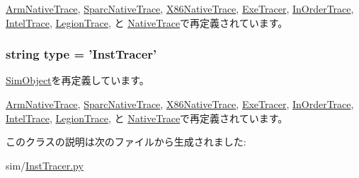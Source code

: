 \hyperlink{classArmNativeTrace_1_1ArmNativeTrace_a17da7064bc5c518791f0c891eff05fda}{ArmNativeTrace}, \hyperlink{classSparcNativeTrace_1_1SparcNativeTrace_a17da7064bc5c518791f0c891eff05fda}{SparcNativeTrace}, \hyperlink{classX86NativeTrace_1_1X86NativeTrace_a17da7064bc5c518791f0c891eff05fda}{X86NativeTrace}, \hyperlink{classExeTracer_1_1ExeTracer_a17da7064bc5c518791f0c891eff05fda}{ExeTracer}, \hyperlink{classInOrderTrace_1_1InOrderTrace_a17da7064bc5c518791f0c891eff05fda}{InOrderTrace}, \hyperlink{classIntelTrace_1_1IntelTrace_a17da7064bc5c518791f0c891eff05fda}{IntelTrace}, \hyperlink{classLegionTrace_1_1LegionTrace_a17da7064bc5c518791f0c891eff05fda}{LegionTrace}, と \hyperlink{classNativeTrace_1_1NativeTrace_a17da7064bc5c518791f0c891eff05fda}{NativeTrace}で再定義されています。\hypertarget{classInstTracer_1_1InstTracer_acce15679d830831b0bbe8ebc2a60b2ca}{
\subsubsection[{type}]{\setlength{\rightskip}{0pt plus 5cm}string {\bf type} = '{\bf InstTracer}'}}
\label{classInstTracer_1_1InstTracer_acce15679d830831b0bbe8ebc2a60b2ca}


\hyperlink{classm5_1_1SimObject_1_1SimObject_acce15679d830831b0bbe8ebc2a60b2ca}{SimObject}を再定義しています。

\hyperlink{classArmNativeTrace_1_1ArmNativeTrace_acce15679d830831b0bbe8ebc2a60b2ca}{ArmNativeTrace}, \hyperlink{classSparcNativeTrace_1_1SparcNativeTrace_acce15679d830831b0bbe8ebc2a60b2ca}{SparcNativeTrace}, \hyperlink{classX86NativeTrace_1_1X86NativeTrace_acce15679d830831b0bbe8ebc2a60b2ca}{X86NativeTrace}, \hyperlink{classExeTracer_1_1ExeTracer_acce15679d830831b0bbe8ebc2a60b2ca}{ExeTracer}, \hyperlink{classInOrderTrace_1_1InOrderTrace_acce15679d830831b0bbe8ebc2a60b2ca}{InOrderTrace}, \hyperlink{classIntelTrace_1_1IntelTrace_acce15679d830831b0bbe8ebc2a60b2ca}{IntelTrace}, \hyperlink{classLegionTrace_1_1LegionTrace_acce15679d830831b0bbe8ebc2a60b2ca}{LegionTrace}, と \hyperlink{classNativeTrace_1_1NativeTrace_acce15679d830831b0bbe8ebc2a60b2ca}{NativeTrace}で再定義されています。

このクラスの説明は次のファイルから生成されました:\begin{DoxyCompactItemize}
\item 
sim/\hyperlink{InstTracer_8py}{InstTracer.py}\end{DoxyCompactItemize}
